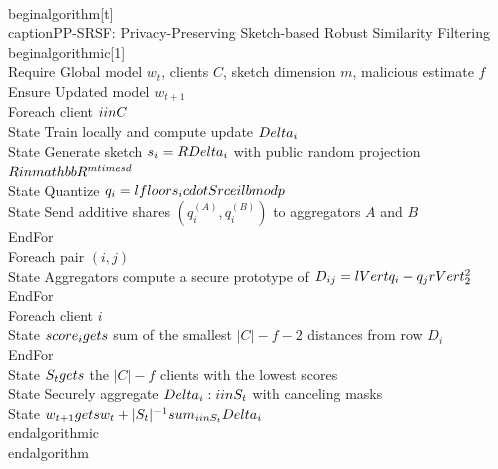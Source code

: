 \\begin{algorithm}[t]
\\caption{PP-SRSF: Privacy-Preserving Sketch-based Robust Similarity Filtering}
\\begin{algorithmic}[1]
\\Require Global model $w_t$, clients $C$, sketch dimension $m$, malicious estimate $f$
\\Ensure Updated model $w_{t+1}$
\\For{each client $i \\in C$}
  \\State Train locally and compute update $\\Delta_i$
  \\State Generate sketch $s_i = R\\Delta_i$ with public random projection $R \\in \\mathbb{R}^{m \\times d}$
  \\State Quantize $q_i = \\lfloor s_i \\cdot S \\rceil \\bmod p$
  \\State Send additive shares $(q_i^{(A)}, q_i^{(B)})$ to aggregators $A$ and $B$
\\EndFor
\\For{each pair $(i,j)$}
  \\State Aggregators compute a secure prototype of $D_{ij}=\\lVert q_i-q_j\\rVert_2^2$
\\EndFor
\\For{each client $i$}
  \\State $score_i \\gets$ sum of the smallest $|C|-f-2$ distances from row $D_i$
\\EndFor
\\State $S_t \\gets$ the $|C|-f$ clients with the lowest scores
\\State Securely aggregate $\\{\\Delta_i : i \\in S_t\\}$ with canceling masks
\\State $w_{t+1} \\gets w_t + |S_t|^{-1}\\sum_{i\\in S_t}\\Delta_i$
\\end{algorithmic}
\\end{algorithm}
